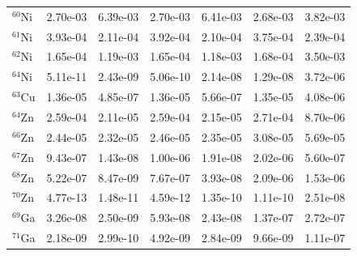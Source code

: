 \begin{table}
\begin{tabular}{l|cc|cc|cc}
$^{60}$Ni & 2.70e-03 & 6.39e-03 & 2.70e-03 & 6.41e-03 & 2.68e-03 & 3.82e-03\\
$^{61}$Ni & 3.93e-04 & 2.11e-04 & 3.92e-04 & 2.10e-04 & 3.75e-04 & 2.39e-04\\
$^{62}$Ni & 1.65e-04 & 1.19e-03 & 1.65e-04 & 1.18e-03 & 1.68e-04 & 3.50e-03\\
$^{64}$Ni & 5.11e-11 & 2.43e-09 & 5.06e-10 & 2.14e-08 & 1.29e-08 & 3.72e-06\\
$^{63}$Cu & 1.36e-05 & 4.85e-07 & 1.36e-05 & 5.66e-07 & 1.35e-05 & 4.08e-06\\
$^{64}$Zn & 2.59e-04 & 2.11e-05 & 2.59e-04 & 2.15e-05 & 2.71e-04 & 8.70e-06\\
$^{66}$Zn & 2.44e-05 & 2.32e-05 & 2.46e-05 & 2.35e-05 & 3.08e-05 & 5.69e-05\\
$^{67}$Zn & 9.43e-07 & 1.43e-08 & 1.00e-06 & 1.91e-08 & 2.02e-06 & 5.60e-07\\
$^{68}$Zn & 5.22e-07 & 8.47e-09 & 7.67e-07 & 3.93e-08 & 2.09e-06 & 1.53e-06\\
$^{70}$Zn & 4.77e-13 & 1.48e-11 & 4.59e-12 & 1.35e-10 & 1.11e-10 & 2.51e-08\\
$^{69}$Ga & 3.26e-08 & 2.50e-09 & 5.93e-08 & 2.43e-08 & 1.37e-07 & 2.72e-07\\
$^{71}$Ga & 2.18e-09 & 2.99e-10 & 4.92e-09 & 2.84e-09 & 9.66e-09 & 1.11e-07\\
\hline
\end{tabular}
\end{table}
\newpage


